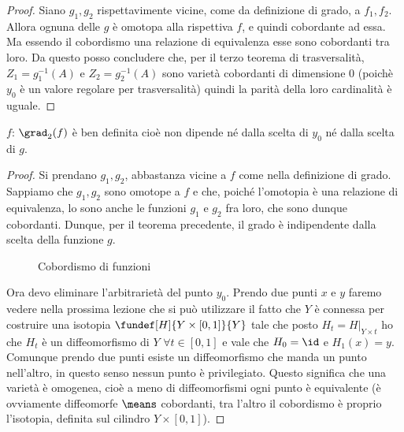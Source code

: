 \begin{proof}
 Siano $g_{1}, g_{2}$ rispettavimente vicine, come da definizione di grado, a $f_{1}, f_{2}$. Allora ognuna delle $g$ è omotopa alla rispettiva $f$, e quindi cobordante ad essa.
 Ma essendo il cobordismo una relazione di equivalenza esse sono cobordanti tra loro.
 Da questo posso concludere che, per il terzo teorema di trasversalità, $Z_{1} = g_{1}^{-1} (A)$ e $Z_{2} = g_{2}^{-1} (A)$ sono varietà cobordanti di dimensione 0 (poichè $y_0$ è un valore regolare per trasversalità) quindi la parità della loro cardinalità è uguale. 
\end{proof}

\begin{cor}
$f$: $\grad_{2}(f)$ è ben definita cioè non dipende né dalla scelta di $y_{0}$ né dalla scelta di $g$. 
\end{cor}

\begin{proof}
 Si prendano $g_{1}, g_{2}$, abbastanza vicine a $f$ come nella definizione di grado.
 Sappiamo che $g_{1}, g_{2}$ sono omotope a $f$ e che, poiché l'omotopia è una relazione di equivalenza, lo sono anche le funzioni $g_{1}$ e $g_{2}$ fra loro, che sono dunque cobordanti. Dunque, per il teorema precedente, il grado è indipendente dalla scelta della funzione $g$.
 
\begin{figure}
    \centering %
    
    \caption{Cobordismo di funzioni}
\end{figure}
 
Ora devo eliminare l'arbitrarietà del punto $y_{0}$. Prendo due punti $x$ e $y$ faremo vedere nella prossima lezione che si può utilizzare il fatto che $Y$ è connessa per costruire una isotopia
$\fundef[H]{Y \times [0,1]}{Y}$ tale che posto $H_{t} = H|_{Y \times {t}}$ ho che $H_{t}$ è un diffeomorfismo di $Y$ $\forall t \in [0,1]$  e vale che $H_{0} = \id$ e $H_{1} (x) = y$.
Comunque prendo due punti esiste un diffeomorfismo che manda un punto nell'altro, in questo senso nessun punto è privilegiato. Questo significa che una varietà è omogenea, cioè a meno di diffeomorfismi ogni punto è equivalente (è ovviamente diffeomorfe $\means$ cobordanti, tra l'altro  il cobordismo è proprio l'isotopia, definita sul cilindro $Y \times [0,1]$).
\end{proof}

